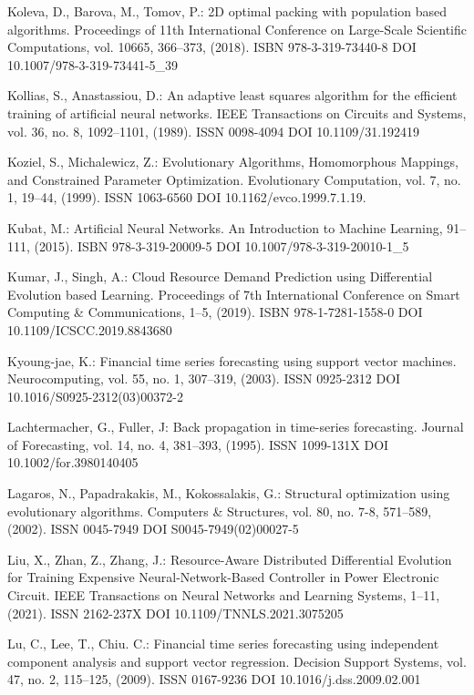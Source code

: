 \begin{thebibliography}{99.}
 Koleva, D., Barova, M., Tomov, P.: 2D optimal packing with population based algorithms. Proceedings of 11th International Conference on Large-Scale Scientific Computations, vol. 10665, 366--373, (2018). ISBN 978-3-319-73440-8 DOI 10.1007/978-3-319-73441-5\_39

 Kollias, S., Anastassiou, D.: An adaptive least squares algorithm for the efficient training of artificial neural networks. IEEE Transactions on Circuits and Systems, vol. 36, no. 8, 1092--1101, (1989). ISSN 0098-4094 DOI 10.1109/31.192419

 Koziel, S., Michalewicz, Z.: Evolutionary Algorithms, Homomorphous Mappings, and Constrained Parameter Optimization. Evolutionary Computation, vol. 7, no. 1, 19--44, (1999). ISSN 1063-6560 DOI 10.1162/evco.1999.7.1.19.

 Kubat, M.: Artificial Neural Networks. An Introduction to Machine Learning, 91--111, (2015). ISBN 978-3-319-20009-5 DOI 10.1007/978-3-319-20010-1\_5

 Kumar, J., Singh, A.: Cloud Resource Demand Prediction using Differential Evolution based Learning. Proceedings of 7th International Conference on Smart Computing \& Communications, 1--5, (2019). ISBN 978-1-7281-1558-0 DOI 10.1109/ICSCC.2019.8843680

 Kyoung-jae, K.: Financial time series forecasting using support vector machines. Neurocomputing, vol. 55, no. 1, 307--319, (2003). ISSN 0925-2312 DOI 10.1016/S0925-2312(03)00372-2

 Lachtermacher, G., Fuller, J: Back propagation in time-series forecasting. Journal of Forecasting, vol. 14, no. 4, 381--393, (1995). ISSN 1099-131X DOI 10.1002/for.3980140405

 Lagaros, N., Papadrakakis, M., Kokossalakis, G.: Structural optimization using evolutionary algorithms. Computers \& Structures, vol. 80, no. 7-8, 571--589, (2002). ISSN 0045-7949 DOI S0045-7949(02)00027-5

 Liu, X., Zhan, Z., Zhang, J.: Resource-Aware Distributed Differential Evolution for Training Expensive Neural-Network-Based Controller in Power Electronic Circuit. IEEE Transactions on Neural Networks and Learning Systems, 1--11, (2021). ISSN 2162-237X DOI 10.1109/TNNLS.2021.3075205

 Lu, C., Lee, T., Chiu. C.: Financial time series forecasting using independent component analysis and support vector regression. Decision Support Systems, vol. 47, no. 2, 115--125, (2009). ISSN 0167-9236 DOI 10.1016/j.dss.2009.02.001


\end{thebibliography}
